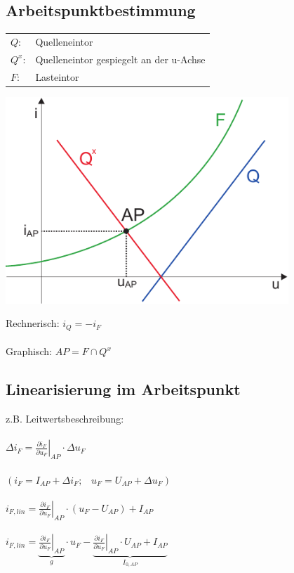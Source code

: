 \documentclass[a4paper,twocolumn,10pt]{article}
\begin{document}
\subsection*{Arbeitspunktbestimmung}
\begin{tabular}{ll}
$Q$: & Quelleneintor\\
$Q^x$: & Quelleneintor gespiegelt an der u-Achse\\
$F$: & Lasteintor
\end{tabular}
\begin{minipage}[b]{0.23\textwidth}
\centering
\includegraphics[width=0.8\textwidth]{img/Arbeitspunkt}\\
\end{minipage}
\hfill
\begin{minipage}[b]{0.23\textwidth}
Rechnerisch: $i_Q=-i_F$\\\\
Graphisch: $AP=F\cap Q^x$
\end{minipage}

\subsection*{Linearisierung im Arbeitspunkt}
z.B. Leitwertsbeschreibung:\\\\
$\Delta i_F=\left.\frac{\partial i_F}{\partial u_F} \right|_{AP}\cdot \Delta u_F$\\\\
$(i_F=I_{AP}+\Delta i_F;\;\;\;u_F=U_{AP}+\Delta u_F)$\\\\
$i_{F,lin}=\left.\frac{\partial i_F}{\partial u_F} \right|_{AP}\cdot (u_F-U_{AP})+I_{AP}$\\\\
$i_{F,lin}=\underbrace{\left.\frac{\partial i_F}{\partial u_F} \right|_{AP}}_{g}\cdot u_F-\underbrace{\left.\frac{\partial i_F}{\partial u_F} \right|_{AP}\cdot U_{AP}+I_{AP}}_{I_{0,AP}}$
\end{document}
